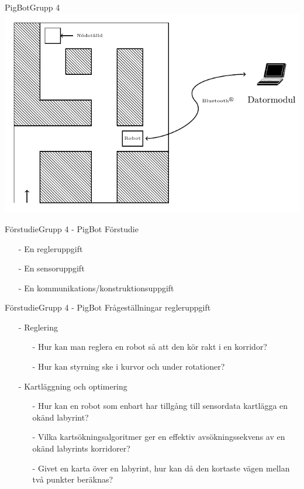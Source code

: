 \begin{frame}[fragile]{PigBot}{Grupp 4}
\centering
    \includegraphics[scale=0.7]{images/overview.pdf}
\end{frame}


\begin{frame}{Förstudie}{Grupp 4 - PigBot}
Förstudie
\pause
  \begin{itemize}
    \item[-] En regleruppgift
    \item[-] En sensoruppgift 
    \item[-] En kommunikations/konstruktionsuppgift
  \end{itemize}
\end{frame}


\begin{frame}{Förstudie}{Grupp 4 - PigBot}
Frågeställningar regleruppgift
  \begin{itemize}
\pause
    \item[-] Reglering
\pause
\begin{itemize}
	\item [-] Hur kan man reglera en robot så att den kör rakt i en korridor?
	\item [-] Hur kan styrning ske i kurvor och under rotationer?
\end{itemize}
\pause
    \item[-] Kartläggning och optimering 
\begin{itemize}
	\item [-] Hur kan en robot som enbart har tillgång till sensordata kartlägga en okänd labyrint?
	\item [-] Vilka kartsökningsalgoritmer ger en effektiv avsökningssekvens av en okänd labyrints korridorer?
	\item [-] Givet en karta över en labyrint, hur kan då den kortaste vägen mellan två punkter beräknas?
\end{itemize}
  \end{itemize}
\end{frame}

